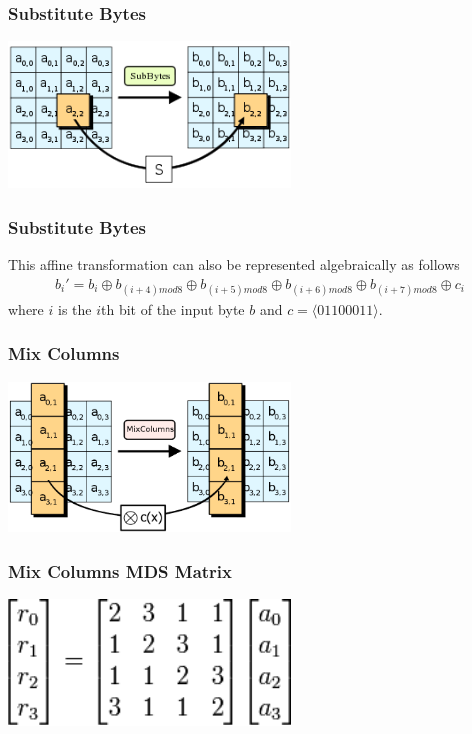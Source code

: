 \documentclass[handout]{beamer}
\begin{document}
\begin{frame}
	\frametitle{Substitute Bytes} %
	\begin{center}
      		\includegraphics[width=75mm]{images/sub.png}
	\end{center}
\end{frame}

\begin{frame}
	\frametitle{Substitute Bytes}
	This affine transformation can also be represented algebraically as follows
	\begin{eqnarray*}
		b_i' = b_i \oplus b_{(i+4) mod 8} \oplus b_{(i+5) mod 8} \oplus b_{(i+6) mod 8} \oplus b_{(i+7) mod 8} \oplus c_i
	\end{eqnarray*}
	where $i$ is the $i$th bit of the input byte $b$ and $c = \langle 01100011 \rangle$.
\end{frame}

\begin{frame}
	\frametitle{Mix Columns}
	\begin{center}
      		\includegraphics[width=75mm]{images/mix.png}
	\end{center}
\end{frame}

\begin{frame}
	\frametitle{Mix Columns MDS Matrix}
	\begin{center}
      		\includegraphics[width=75mm]{images/mix_ops.png} %
	\end{center}
\end{frame}
\end{document}

